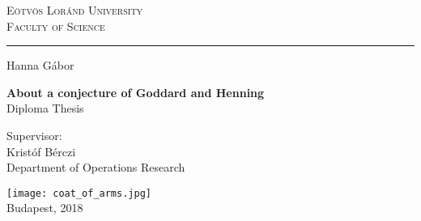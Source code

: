 \begin{titlepage}
  \begin{center}
    \textsc{
      \large
      Eötvös Loránd University \\
      Faculty of Science \\
    }
    \vspace{0.4cm}

    \rule{14cm}{0.4pt}
    \vspace*{1.2cm}

    \LARGE{Hanna Gábor}

    \huge
    \vspace{0.6cm}
    \textbf{About a conjecture of Goddard and Henning} \\
    \vspace{0.3cm}
    \normalsize
    Diploma Thesis \\
    \vspace{1.3cm}

    \large
    Supervisor: \\
    \vspace{0.3cm}
    Kristóf Bérczi \\
    Department of Operations Research

    \vfill
    \texttt{[image: coat\_of\_arms.jpg]} \\
    \vspace{0.1cm}
    \normalsize
    Budapest, 2018
  \end{center}
\end{titlepage}
